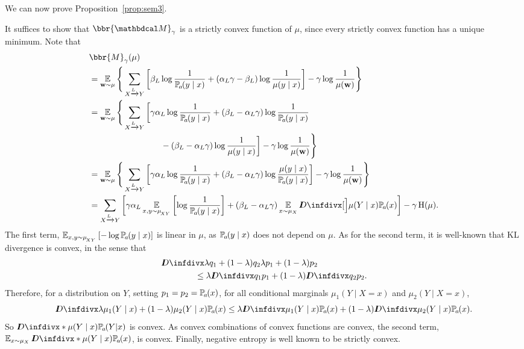 \begin{subappendices}
We can now prove         Proposition~\ref{prop:sem3}.
\begin{lproof}\label{proof:sem3}
It suffices to show that $\bbr{\dg
			  M}_\gamma$ is a strictly convex function of $\mu$,
since every strictly convex function has a unique minimum.
Note that
\begin{align*}
&   \bbr{M}_\gamma(\mu) 
\\	&= \Ex_{\mat w \sim \mu} \Bigg\{   \sum_{ X \xrightarrow{\!\!L} Y  } \left[
		\beta_L \log \frac{1}{\p_a(y\mid x)} + ({\alpha_L}\gamma - \beta_L ) \log \frac{1}{\mu(y \mid x)} \right] - \gamma \log \frac{1}{\mu(\mat w)} \Bigg\} \\
	&= \Ex_{\mat w \sim \mu} \Bigg\{   \sum_{ X \xrightarrow{\!\!L} Y  } \bigg[ \gamma {\alpha_L} \log \frac{1}{\p_a(y\mid x)} + 
		(\beta_L - {\alpha_L} \gamma) \log \frac{1}{\p_a(y\mid x)} \\
        &\hspace{3cm}- (\beta_L - {\alpha_L} \gamma) \log \frac{1}{\mu(y \mid x)} \bigg] - \gamma \log \frac{1}{\mu(\mat w)} \Bigg\}  \\
	&= \Ex_{\mat w \sim \mu} \Bigg\{   \sum_{ X \xrightarrow{\!\!L} Y  } \left[ \gamma {\alpha_L} \log \frac{1}{\p_a(y\mid x)} + 
		(\beta_L - {\alpha_L} \gamma) \log \frac{\mu(y\mid x)}{\p_a(y\mid x)} \right] - \gamma \log \frac{1}{\mu(\mat w)} \Bigg\} \\
	&=  \sum_{ X \xrightarrow{\!\!L} Y  } \left[ \gamma {\alpha_L} \Ex_{x,y \sim \mu_{\!_{XY}}} \left[ \log \frac{1}{\p_a(y\mid x)} \right] + 
		(\beta_L - {\alpha_L} \gamma) \Ex_{x\sim\mu_X}
          \kldiv[\Big]{\mu(Y\mid x)}{\p_a( x)} \right] - \gamma \H(\mu). 
\end{align*}
The first term, 
\( \Ex_{x,y \sim \mu_{\!_{XY}}} \left[-\log {\p_a(y\mid x)}\right] \) 
is linear in $\mu$, as $\p_a(y\mid x)$ does not depend on $\mu$. %
As for the second term, it is well-known that KL divergence is convex, in the sense that 
\begin{align*}
    &\kldiv{\lambda q_1 + (1-\lambda) q_2 }{ \lambda p_1 + (1-\lambda) p_2}
    \\&\qquad\qquad \leq \lambda \kldiv {q_1}{ p_1} +
                (1-\lambda) \kldiv{q_2}{p_2}.
\end{align*}
Therefore, for a distribution on $Y$, setting $p_1 =
 p_2 = \p_a(x)$, for all conditional marginals $\mu_1(Y \mid X=x)$ and
			$\mu_2(Y\mid X=x)$,
	\[ \kldiv{\lambda \mu_1(Y\mid x) + (1-\lambda)
			  \mu_2(Y\mid x) }{ \p_a(x) } \leq \lambda \kldiv
			   {\mu_1(Y\mid x)}{\p_a(x)} + (1-\lambda)
								  \kldiv{\mu_2(Y\mid x)}{\p_a(x)}. \] 
	So $\kldiv*{\mu(Y\mid x)}{\p_a(Y|x)}$ is convex. As
			convex combinations of convex functions are convex,
			the second term, $\Ex_{x\sim\mu_X}\kldiv*{\mu(Y\mid
			  x)}{\p_a( x)}$, is convex.
Finally, negative entropy is well known to be strictly convex.                


\end{lproof}
\end{subappendices}
